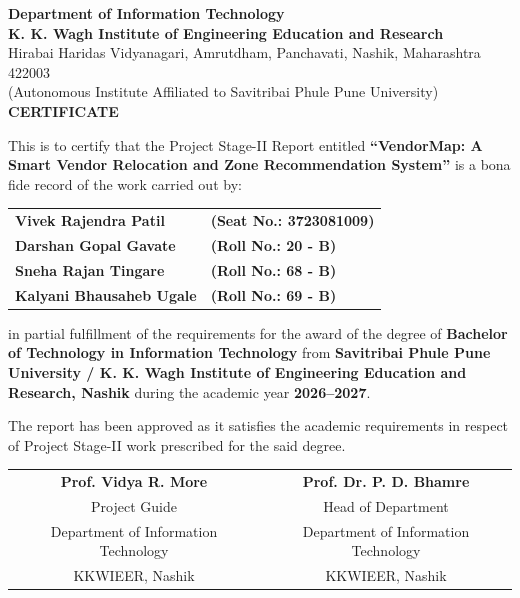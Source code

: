 \begin{center}
    \textbf{\Large Department of Information Technology}\\[0.2cm]
    \textbf{\Large K. K. Wagh Institute of Engineering Education and Research}\\[0.1cm]
    {\normalsize Hirabai Haridas Vidyanagari, Amrutdham, Panchavati, Nashik, Maharashtra 422003}\\[0.1cm]
    {\small (Autonomous Institute Affiliated to Savitribai Phule Pune University)}\\[0.6cm]
    
    \textbf{\LARGE CERTIFICATE}\\[0.8cm]
\end{center}

\noindent This is to certify that the Project Stage-II Report entitled \textbf{``VendorMap: A Smart Vendor Relocation and Zone Recommendation System''} is a bona fide record of the work carried out by:

\begin{center}
\begin{tabular}{ll}
\textbf{Vivek Rajendra Patil} & \textbf{(Seat No.: 3723081009)} \\
\textbf{Darshan Gopal Gavate} & \textbf{(Roll No.: 20 - B)} \\
\textbf{Sneha Rajan Tingare} & \textbf{(Roll No.: 68 - B)} \\
\textbf{Kalyani Bhausaheb Ugale} & \textbf{(Roll No.: 69 - B)} \\
\end{tabular}
\end{center}

\noindent in partial fulfillment of the requirements for the award of the degree of \textbf{Bachelor of Technology in Information Technology} from \textbf{Savitribai Phule Pune University / K. K. Wagh Institute of Engineering Education and Research, Nashik} during the academic year \textbf{2026--2027}.

\noindent The report has been approved as it satisfies the academic requirements in respect of Project Stage-II work prescribed for the said degree.

\vspace{2.5cm}

\noindent
\begin{tabular*}{\textwidth}{@{\extracolsep{\fill}}cc}
    \textbf{Prof. Vidya R. More} & \textbf{Prof. Dr. P. D. Bhamre} \\
    Project Guide & Head of Department \\
    Department of Information Technology & Department of Information Technology \\
    KKWIEER, Nashik & KKWIEER, Nashik \\
\end{tabular*}


